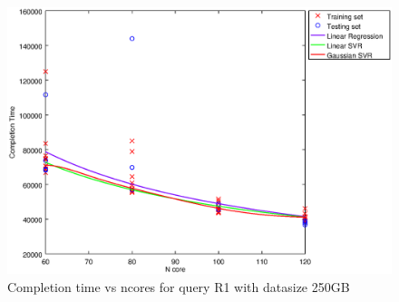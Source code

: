 
\begin {figure}[hbtp]
\centering
\includegraphics[width=\textwidth]{output/R1_250_ONLY_1_OVER_NCORES/plot_R1_250_bestmodels.eps}
\caption{Completion time vs ncores for query R1 with datasize 250GB}
\label{fig:all_nonlinear_R1_250}
\end {figure}
